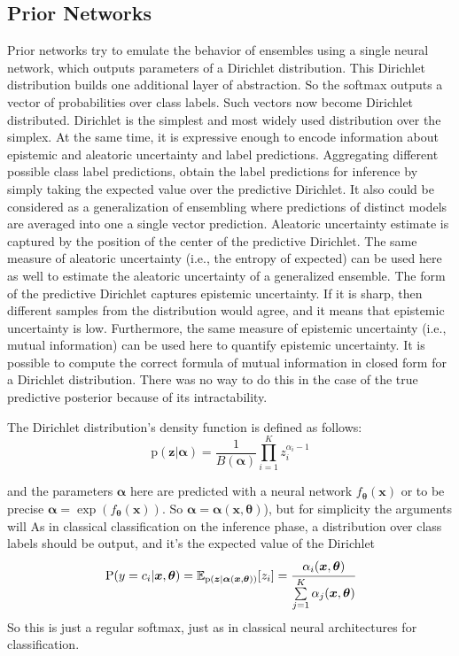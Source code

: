 \documentclass{article}
\begin{document}
\subsection{Prior Networks}
Prior networks \cite{prior_net} try to emulate the behavior of ensembles using a single neural network, which outputs parameters of a Dirichlet distribution.
This Dirichlet distribution builds one additional layer of abstraction.
So the softmax outputs a vector of probabilities over class labels.
Such vectors now become Dirichlet distributed.
Dirichlet is the simplest and most widely used distribution over the simplex. At the same time, it is expressive enough to encode information about epistemic and aleatoric uncertainty and label predictions.
Aggregating different possible class label predictions, obtain the label predictions for inference by simply taking the expected value over the predictive Dirichlet.
It also could be considered as a generalization of ensembling where predictions of distinct models are averaged into one a single vector prediction.
Aleatoric uncertainty estimate is captured by the position of the center of the predictive Dirichlet.
The same measure of aleatoric uncertainty (i.e., the entropy of expected) can be used here as well to estimate the aleatoric uncertainty of a generalized ensemble.
The form of the predictive Dirichlet captures epistemic uncertainty.
If it is sharp, then different samples from the distribution would agree, and it means that epistemic uncertainty is low.
Furthermore, the same measure of epistemic uncertainty (i.e., mutual information) can be used here to quantify epistemic uncertainty.
It is possible to compute the correct formula of mutual information in closed form for a Dirichlet distribution.
There was no way to do this in the case of the true predictive posterior because of its intractability.


The Dirichlet distribution's density function is defined as follows:
\begin{equation}
\mathrm{p}(\boldsymbol{z} | \boldsymbol{\alpha}) = \frac{1}{B(\boldsymbol{\alpha})} \prod_{i=1}^K z_i^{\alpha_i - 1}
\end{equation}

and the parameters $\boldsymbol{\alpha}$ here are predicted with a neural network $f_{\boldsymbol{\theta}}(\boldsymbol{x})$ or to be precise $\boldsymbol{\alpha} = \exp(f_{\boldsymbol{\theta}}(\boldsymbol{x}))$.
So $\boldsymbol{\alpha} = \boldsymbol{\alpha}(\boldsymbol{x}, \boldsymbol{\theta})$), but for simplicity the arguments will
As in classical classification on the inference phase, a distribution over class labels should be output, and it's the expected value of the Dirichlet
\begin{equation}
\mathrm{P}(y = c_i | \boldsymbol{x}, \boldsymbol{\theta}) = \mathbb{E}_{\mathrm{p}(\boldsymbol{z} | \boldsymbol{\alpha}(\boldsymbol{x}, \boldsymbol{\theta}))} [z_i] = \cfrac{\alpha_i(\boldsymbol{x}, \boldsymbol{\theta})}{\sum\limits_{j=1}^K \alpha_j(\boldsymbol{x}, \boldsymbol{\theta})}
\end{equation}
So this is just a regular softmax, just as in classical neural architectures for classification.
\end{document}
